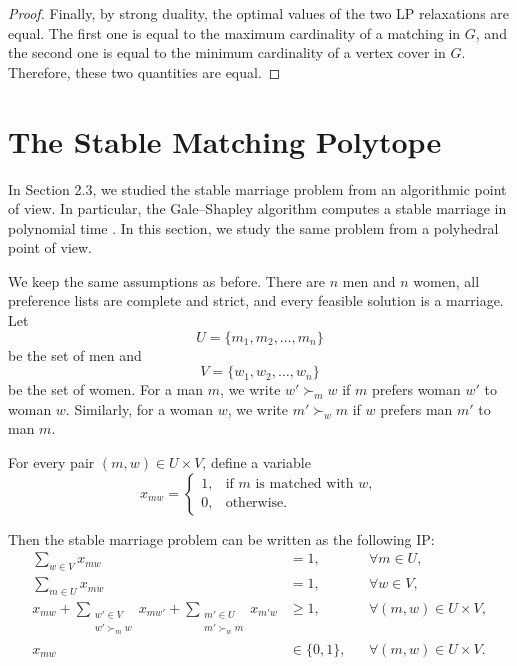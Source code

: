\documentclass[12pt]{report}
\numberwithin{algorithm}{chapter}
\begin{document}
\begin{proof}
		Finally, by strong duality, the optimal values of the two LP relaxations are equal. The first one is equal to the maximum cardinality of a matching in $G$, and the second one is equal to the minimum cardinality of a vertex cover in $G$. Therefore, these two quantities are equal.
	\end{proof}

\section{The Stable Matching Polytope} \label{sec:stable-matching-polytope}
	
	In Section 2.3, we studied the stable marriage problem from an algorithmic point of view. In particular, the Gale--Shapley algorithm computes a stable marriage in polynomial time \cite{Gale01011962}. In this section, we study the same problem from a polyhedral point of view.
	
	We keep the same assumptions as before. There are $n$ men and $n$ women, all preference lists are complete and strict, and every feasible solution is a marriage. Let
	\[
	U=\{m_1,m_2,\dots,m_n\}
	\]
	be the set of men and
	\[
	V=\{w_1,w_2,\dots,w_n\}
	\]
	be the set of women. For a man $m$, we write $w'\succ_m w$ if $m$ prefers woman $w'$ to woman $w$. Similarly, for a woman $w$, we write $m'\succ_w m$ if $w$ prefers man $m'$ to man $m$.
	
	For every pair $(m,w)\in U\times V$, define a variable
	\[
	x_{mw}=
	\begin{cases}
		1, & \text{if } m \text{ is matched with } w,\\
		0, & \text{otherwise}.
	\end{cases}
	\]
	
	Then the stable marriage problem can be written as the following IP:
	\begin{equation}
		\label{stable-marriage-ip}
		\begin{aligned}
			\sum_{w\in V} x_{mw} &= 1,
			&& \forall m\in U,\\
			\sum_{m\in U} x_{mw} &= 1,
			&& \forall w\in V,\\
			x_{mw}
			+
			\sum_{\substack{w'\in V\\ w'\succ_m w}} x_{mw'}
			+
			\sum_{\substack{m'\in U\\ m'\succ_w m}} x_{m'w}
			&\geq 1,
			&& \forall (m,w)\in U\times V,\\
			x_{mw} &\in \{0,1\},
			&& \forall (m,w)\in U\times V.
		\end{aligned}
	\end{equation}
	
\end{document}
